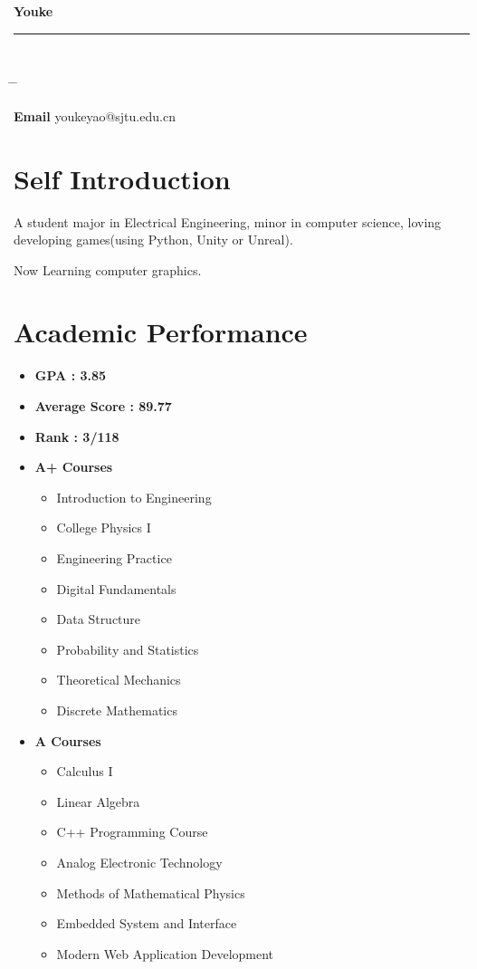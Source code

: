 \documentclass{article}
\begin{document}
{\huge{\color{slateblue}\textbf{Youke}}}\\
\rule{\textwidth}{0.5mm}\\


\parbox{0.5\textwidth}{
\begin{tabbing}
\hspace{3cm} \= \hspace{4cm} \= \kill

{\bf Email} \> youkeyao@sjtu.edu.cn \\

\end{tabbing}
}


\section*{Self Introduction}
A student major in Electrical Engineering, minor in computer science,
loving developing games(using Python, Unity or Unreal).

Now Learning computer graphics.


\section*{Academic Performance}
\begin{itemize}
    \item {\bf GPA :  3.85}
    \item {\bf Average Score : 89.77}
    \item {\bf Rank : 3/118}
    \item {\bf A+ Courses}
    \begin{itemize}
        \item Introduction to Engineering
        \item College Physics I
        \item Engineering Practice
        \item Digital Fundamentals
        \item Data Structure
        \item Probability and Statistics
        \item Theoretical Mechanics
        \item Discrete Mathematics
    \end{itemize}
    \item {\bf A Courses}
    \begin{itemize}
        \item Calculus I
        \item Linear Algebra
        \item C++ Programming Course
        \item Analog Electronic Technology
        \item Methods of Mathematical Physics
        \item Embedded System and Interface
        \item Modern Web Application Development
    \end{itemize}
\end{itemize}
\end{document}
